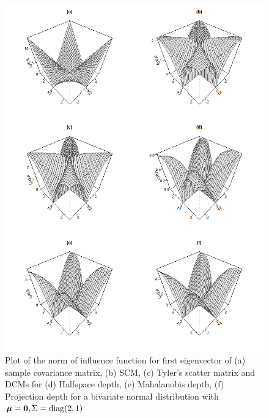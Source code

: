 \documentclass[fleqn,11pt]{article}
\DeclareMathOperator*{\diag}{diag}
\begin{document}
\begin{figure}[]
	\centering
		\includegraphics[width=12cm]{IFnorm.png}
	\caption{Plot of the norm of influence function for first eigenvector of (a) sample covariance matrix, (b) SCM, (c) Tyler's scatter matrix and DCMs for (d) Halfspace depth, (e) Mahalanobis depth, (f) Projection depth for a bivariate normal distribution with $\bfmu = {\bf 0}, \Sigma = \diag(2,1)$}
	\label{fig:IFnorm}
\end{figure}
\end{document}

